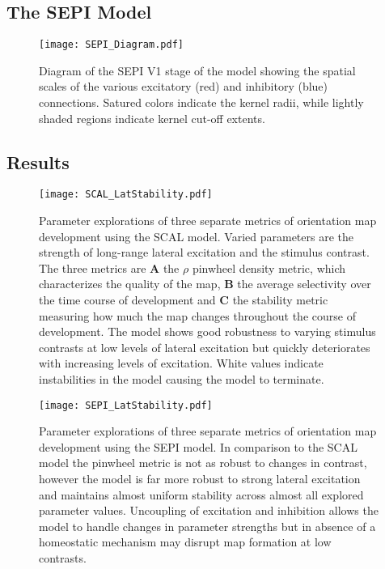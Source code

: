 \subsection{The SEPI Model}


\begin{figure}
	\centering
        \texttt{[image: SEPI\_Diagram.pdf]}
	\caption{Diagram of the SEPI V1 stage of the model showing the
          spatial scales of the various excitatory (red) and
          inhibitory (blue) connections. Satured colors indicate the
          kernel radii, while lightly shaded regions indicate kernel
          cut-off extents.}
	\label{SCALDiagram}
\end{figure}


\subsection{Results}

\begin{figure}
	\centering
        \texttt{[image: SCAL\_LatStability.pdf]}
	\caption{Parameter explorations of three separate metrics of
          orientation map development using the SCAL model. Varied
          parameters are the strength of long-range lateral excitation
          and the stimulus contrast. The three metrics are \textbf{A}
          the $\rho$ pinwheel density metric, which characterizes the
          quality of the map, \textbf{B} the average selectivity over
          the time course of development and \textbf{C} the stability
          metric measuring how much the map changes throughout the
          course of development. The model shows good robustness to
          varying stimulus contrasts at low levels of lateral
          excitation but quickly deteriorates with increasing levels
          of excitation. White values indicate instabilities in the
          model causing the model to terminate.}
	\label{SCALStability}
\end{figure}


\begin{figure}
	\centering
        \texttt{[image: SEPI\_LatStability.pdf]}
	\caption{Parameter explorations of three separate metrics of
          orientation map development using the SEPI model. In
          comparison to the SCAL model the pinwheel metric is not as
          robust to changes in contrast, however the model is far more
          robust to strong lateral excitation and maintains almost
          uniform stability across almost all explored parameter
          values. Uncoupling of excitation and inhibition allows the
          model to handle changes in parameter strengths but in
          absence of a homeostatic mechanism may disrupt map formation
          at low contrasts.}
	\label{SEPIStability}
\end{figure}


